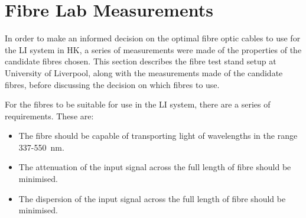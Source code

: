 \documentclass[a4paper,11pt]{article}
\begin{document}
\section{Fibre Lab Measurements}

In order to make an informed decision on the optimal fibre optic cables to use for the LI system in HK, a series of measurements were made of the properties of the candidate fibres chosen. This section describes the fibre test stand setup at University of Liverpool, along with the measurements made of the candidate fibres, before discussing the decision on which fibres to use.

For the fibres to be suitable for use in the LI system, there are a series of requirements. These are:
\begin{itemize}
\item The fibre should be capable of transporting light of wavelengths in the range 337-550~nm.
\item The attenuation of the input signal across the full length of fibre should be minimised.
\item The dispersion of the input signal across the full length of fibre should be minimised.
\end{itemize}
\end{document}
